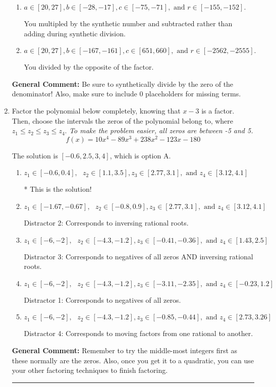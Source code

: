 \documentclass{extbook}[14pt]
\newcommand{\litem}[1]{\item #1

\rule{\textwidth}{0.4pt}}
\begin{document}
\begin{enumerate}
{\begin{enumerate}[label=\Alph*.]
* This is the solution!
\item \( a \in [20, 27], b \in [-28, -17], c \in [-75, -71], \text{ and } r \in [-155, -152]. \)

 You multipled by the synthetic number and subtracted rather than adding during synthetic division.
\item \( a \in [20, 27], b \in [-167, -161], c \in [651, 660], \text{ and } r \in [-2562, -2555]. \)

 You divided by the opposite of the factor.
\end{enumerate}

\textbf{General Comment:} Be sure to synthetically divide by the zero of the denominator! Also, make sure to include 0 placeholders for missing terms.
}
\litem{
Factor the polynomial below completely, knowing that $x-3$ is a factor. Then, choose the intervals the zeros of the polynomial belong to, where $z_1 \leq z_2 \leq z_3 \leq z_4$. \textit{To make the problem easier, all zeros are between -5 and 5.}
\[ f(x) = 10x^{4} -89 x^{3} +238 x^{2} -123 x -180 \]

The solution is \( [-0.6, 2.5, 3, 4] \), which is option A.\begin{enumerate}[label=\Alph*.]
\item \( z_1 \in [-0.6, 0.4], \text{   }  z_2 \in [1.1, 3.5], z_3 \in [2.77, 3.1], \text{   and   } z_4 \in [3.12, 4.1] \)

* This is the solution!
\item \( z_1 \in [-1.67, -0.67], \text{   }  z_2 \in [-0.8, 0.9], z_3 \in [2.77, 3.1], \text{   and   } z_4 \in [3.12, 4.1] \)

 Distractor 2: Corresponds to inversing rational roots.
\item \( z_1 \in [-6, -2], \text{   }  z_2 \in [-4.3, -1.2], z_3 \in [-0.41, -0.36], \text{   and   } z_4 \in [1.43, 2.5] \)

 Distractor 3: Corresponds to negatives of all zeros AND inversing rational roots.
\item \( z_1 \in [-6, -2], \text{   }  z_2 \in [-4.3, -1.2], z_3 \in [-3.11, -2.35], \text{   and   } z_4 \in [-0.23, 1.2] \)

 Distractor 1: Corresponds to negatives of all zeros.
\item \( z_1 \in [-6, -2], \text{   }  z_2 \in [-4.3, -1.2], z_3 \in [-0.85, -0.44], \text{   and   } z_4 \in [2.73, 3.26] \)

 Distractor 4: Corresponds to moving factors from one rational to another.
\end{enumerate}

\textbf{General Comment:} Remember to try the middle-most integers first as these normally are the zeros. Also, once you get it to a quadratic, you can use your other factoring techniques to finish factoring.
}
\end{enumerate}
\end{document}
